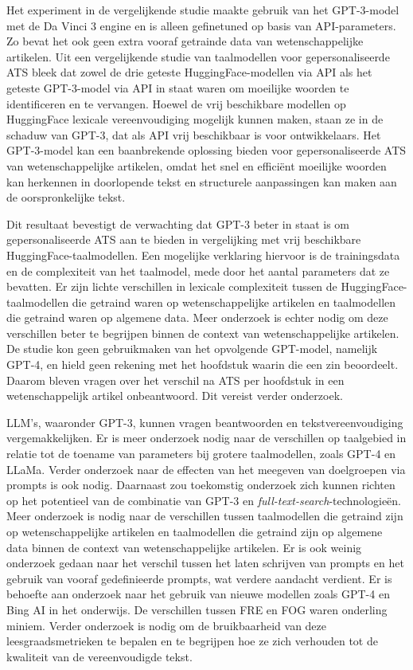 Het experiment in de vergelijkende studie maakte gebruik van het GPT-3-model met de Da Vinci 3 engine en is alleen gefinetuned op basis van API-parameters. Zo bevat het ook geen extra vooraf getrainde data van wetenschappelijke artikelen. Uit een vergelijkende studie van taalmodellen voor gepersonaliseerde ATS bleek dat zowel de drie geteste HuggingFace-modellen via API als het geteste GPT-3-model via API in staat waren om moeilijke woorden te identificeren en te vervangen. Hoewel de vrij beschikbare modellen op HuggingFace lexicale vereenvoudiging mogelijk kunnen maken, staan ze in de schaduw van GPT-3, dat als API vrij beschikbaar is voor ontwikkelaars. Het GPT-3-model kan een baanbrekende oplossing bieden voor gepersonaliseerde ATS van wetenschappelijke artikelen, omdat het snel en efficiënt moeilijke woorden kan herkennen in doorlopende tekst en structurele aanpassingen kan maken aan de oorspronkelijke tekst.

Dit resultaat bevestigt de verwachting dat GPT-3 beter in staat is om gepersonaliseerde ATS aan te bieden in vergelijking met vrij beschikbare HuggingFace-taalmodellen. Een mogelijke verklaring hiervoor is de trainingsdata en de complexiteit van het taalmodel, mede door het aantal parameters dat ze bevatten. Er zijn lichte verschillen in lexicale complexiteit tussen de HuggingFace-taalmodellen die getraind waren op wetenschappelijke artikelen en taalmodellen die getraind waren op algemene data. Meer onderzoek is echter nodig om deze verschillen beter te begrijpen binnen de context van wetenschappelijke artikelen. De studie kon geen gebruikmaken van het opvolgende GPT-model, namelijk GPT-4, en hield geen rekening met het hoofdstuk waarin die een zin beoordeelt. Daarom bleven vragen over het verschil na ATS per hoofdstuk in een wetenschappelijk artikel onbeantwoord. Dit vereist verder onderzoek.

LLM's, waaronder GPT-3, kunnen vragen beantwoorden en tekstvereenvoudiging vergemakkelijken. Er is meer onderzoek nodig naar de verschillen op taalgebied in relatie tot de toename van parameters bij grotere taalmodellen, zoals GPT-4 en LLaMa. Verder onderzoek naar de effecten van het meegeven van doelgroepen via prompts is ook nodig. Daarnaast zou toekomstig onderzoek zich kunnen richten op het potentieel van de combinatie van GPT-3 en \textit{full-text-search}-technologieën. Meer onderzoek is nodig naar de verschillen tussen taalmodellen die getraind zijn op wetenschappelijke artikelen en taalmodellen die getraind zijn op algemene data binnen de context van wetenschappelijke artikelen. Er is ook weinig onderzoek gedaan naar het verschil tussen het laten schrijven van prompts en het gebruik van vooraf gedefinieerde prompts, wat verdere aandacht verdient. Er is behoefte aan onderzoek naar het gebruik van nieuwe modellen zoals GPT-4 en Bing AI in het onderwijs. De verschillen tussen FRE en FOG waren onderling miniem. Verder onderzoek is nodig om de bruikbaarheid van deze leesgraadsmetrieken te bepalen en te begrijpen hoe ze zich verhouden tot de kwaliteit van de vereenvoudigde tekst.


